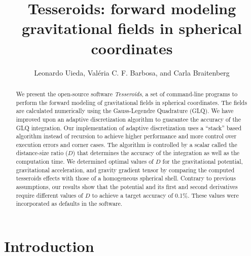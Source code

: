\documentclass[paper,twocolumn,twoside]{geophysics}
\title{
    Tesseroids: forward modeling gravitational fields in spherical coordinates
}
\author{
    Leonardo Uieda\footnotemark[1]\footnotemark[2],
    Val\'eria C. F. Barbosa\footnotemark[2],
    and
    Carla Braitenberg\footnotemark[3]
}
\begin{document}
\maketitle


\address{
\footnotemark[1]Universidade do Estado do Rio de Janeiro,
Rio de Janeiro, Brazil.
email: leouieda@gmail.com
\\
\footnotemark[2]Observat\'orio Nacional,
Rio de Janeiro, Brazil.
email: valcris@on.br
\\
\footnotemark[3]Department of Mathematics and Geosciences,
University of Trieste, Trieste, Italy
}

\begin{abstract}
We present the open-source software \emph{Tesseroids},
a set of command-line programs to perform the forward modeling
of gravitational fields in spherical coordinates.
The fields are calculated numerically using
the Gauss-Legendre Quadrature (GLQ).
We have improved upon an adaptive discretization algorithm
to guarantee the accuracy of the GLQ integration.
Our implementation of adaptive discretization
uses a  ``stack'' based algorithm
instead of recursion to achieve higher performance
and more control over execution errors and corner cases.
The algorithm is controlled by
a scalar called the distance-size ratio ($D$)
that determines the accuracy of the integration as well as
the computation time.
We determined optimal values of $D$
for the gravitational potential, gravitational acceleration,
and gravity gradient tensor
by comparing the computed tesseroids effects
with those of a homogeneous spherical shell.
Contrary to previous assumptions,
our results show that the potential and its first and second derivatives
require different values of $D$ to achieve a target accuracy of 0.1\%.
These values were incorporated as defaults in the software.
\end{abstract}



\section{Introduction}
\end{document}
